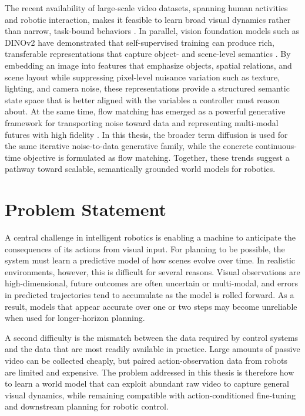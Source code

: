 \documentclass[12pt]{report}
\begin{document}
The recent availability of large-scale video datasets, spanning human activities and robotic interaction, makes it feasible to learn broad visual dynamics rather than narrow, task-bound behaviors \cite{damen2022epickitchens,walke2023bridgedatav2,zhou2025soar,khazatsky2024droid}. In parallel, vision foundation models such as DINOv2 have demonstrated that self-supervised training can produce rich, transferable representations that capture object- and scene-level semantics \cite{oquab2023dinov2}. By embedding an image into features that emphasize objects, spatial relations, and scene layout while suppressing pixel-level nuisance variation such as texture, lighting, and camera noise, these representations provide a structured semantic state space that is better aligned with the variables a controller must reason about.
At the same time, flow matching has emerged as a powerful generative framework for transporting noise toward data and representing multi-modal futures with high fidelity \cite{lipman2023flowmatching, lipman2024flowmatchingguidecode}. In this thesis, the broader term diffusion is used for the same iterative noise-to-data generative family, while the concrete continuous-time objective is formulated as flow matching. Together, these trends suggest a pathway toward scalable, semantically grounded world models for robotics.

\section{Problem Statement}
A central challenge in intelligent robotics is enabling a machine to anticipate the consequences of its actions from visual input. For planning to be possible, the system must learn a predictive model of how scenes evolve over time. In realistic environments, however, this is difficult for several reasons. Visual observations are high-dimensional, future outcomes are often uncertain or multi-modal, and errors in predicted trajectories tend to accumulate as the model is rolled forward. As a result, models that appear accurate over one or two steps may become unreliable when used for longer-horizon planning.

A second difficulty is the mismatch between the data required by control systems and the data that are most readily available in practice. Large amounts of passive video can be collected cheaply, but paired action-observation data from robots are limited and expensive. The problem addressed in this thesis is therefore how to learn a world model that can exploit abundant raw video to capture general visual dynamics, while remaining compatible with action-conditioned fine-tuning and downstream planning for robotic control.
\end{document}
